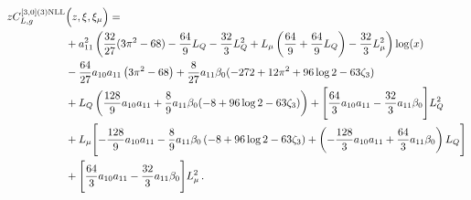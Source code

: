 \documentclass[a4paper]{article}
\begin{document}
	\endgroup
\begingroup
\allowdisplaybreaks
\begin{align}
		z C_{L,g}^{[3, 0](3) \rm NLL}&\Bigl(z,\xi,\xi_\mu\Bigr)= \notag\\
		& + a_{11}^2 \left(\frac{32}{27} (3 \pi^2 - 68) - \frac{64}{9} L_Q - \frac{32}{3} L_Q^2 + L_\mu \left(\frac{64}{9} + \frac{64}{9} L_Q\right)- \frac{32}{3} L_\mu^2\right) \log(x) \notag\\
		& -\frac{64}{27} a_{10} a_{11} \left(3 \pi^2 - 68\right) + \frac{8}{27} a_{11} \beta_0 (-272 + 12 \pi^2 + 96 \log 2 - 63 \zeta_3) \notag\\
		& + L_Q \left(\frac{128}{9} a_{10} a_{11} + \frac{8}{9} a_{11} \beta_0 (-8 + 96 \log 2 - 63 \zeta_3)\right) + \Biggl[ \frac{64}{3} a_{10} a_{11} - \frac{32}{3} a_{11} \beta_0\Biggr] L_Q^2 \notag\\
		& + L_\mu \Biggl[- \frac{128}{9} a_{10} a_{11} - \frac{8}{9} a_{11} \beta_0 \left(-8 + 96 \log 2 - 63 \zeta_3\right) + \left(- \frac{128}{3} a_{10} a_{11} + \frac{64}{3} a_{11} \beta_0 \right) L_Q \Biggr] \notag\\
		& + \Biggl[\frac{64}{3} a_{10} a_{11} - \frac{32}{3} a_{11} \beta_0 \Biggr] L_\mu^2\,.
	\end{align}
	\endgroup
\end{document}
